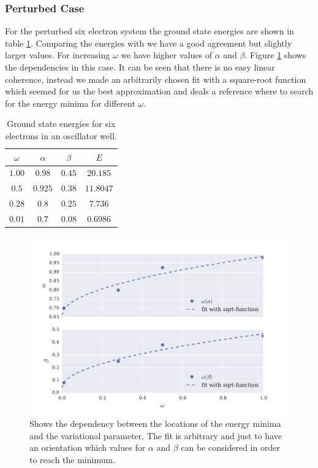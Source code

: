 \subsubsection{Perturbed Case}\label{sec:perturbed_six}
For the perturbed six electron system the ground state energies are shown in table \ref{tab:groundstate_sixelectron}. Comparing the energies with \citet[TABLE III]{lohne2011} we have a good agreement but slightly larger values. For increasing $\omega$ we have higher values of $\alpha$ and $\beta$. Figure \ref{fig:alpha_beta_omega} shows the dependencies in this case. It can be seen that there is no easy linear coherence, instead we made an arbitrarily chosen fit with a square-root function which seemed for us the best approximation and deals a reference where to search for the energy minima for different $\omega$. 
\begin{table}
    \centering
    \caption{Ground state energies for six electrons in an oscillator well.}
    \begin{tabular}{c|cc|c}
    \toprule
    $\omega$   & $\alpha$    & $\beta$ &    $E$    \\
    \midrule
    $1.00$     & $0.98$      & $0.45$  & $20.185$  \\
    $0.5$      & $0.925$	    & $0.38$  & $11.8047$ \\
    $0.28$     & $0.8$       & $0.25$  & $7.736$   \\
    $0.01$     & $0.7$       & $0.08$  & $0.6986$  \\
    \bottomrule
    \end{tabular}
    \label{tab:groundstate_sixelectron}
\end{table}
\begin{figure}[htbp]
    \centering
    \includegraphics[scale=0.7]{alpha_beta_omega.pdf}
    \caption{Shows the dependency between the locations of the energy minima and the variational parameter. The fit is arbitrary and just to have an orientation which values for $\alpha$ and $\beta$ can be considered in order to reach the minimum.}
    \label{fig:alpha_beta_omega}
\end{figure}


